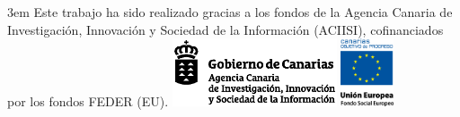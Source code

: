 \cleardoublepage
\thispagestyle{empty}
\null\vskip 6cm
\centering
\graphicspath{{./images/bmps/}{./images/vects/}}
\hfill\begin{minipage}[p]{0.85\textwidth}\parindent 3em
\centering
Este trabajo ha sido realizado gracias a los fondos de la Agencia Canaria de Investigación, Innovación y Sociedad de la Información (ACIISI), cofinanciados por los fondos FEDER (EU).
\vskip 0.5cm
\includegraphics[height=2cm]{aciisi_negro}
\hskip 1cm
\includegraphics[height=2cm]{fondo_social_europeo_cop_ue}
\end{minipage}
